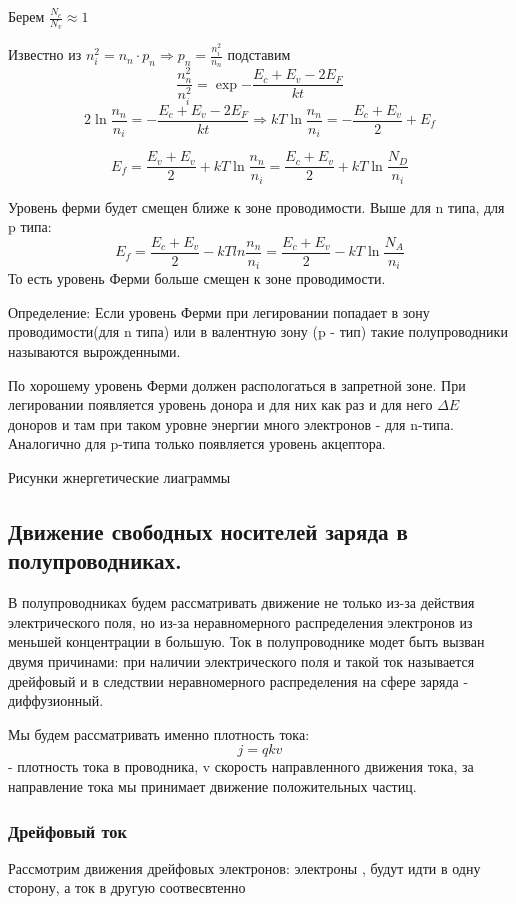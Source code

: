 \documentclass[../main.tex]{subfiles}
\begin{document}
Берем $\frac{N_c}{N_v} \approx 1$ 

Известно из $n_i^2 = n_n \cdot p_n \Rightarrow p_n = \frac{n_i^2}{n_n}$ подставим 
\[\frac{n_n^2}{n_i^2} = \exp{- \frac{E_c + E_v - 2E_F}{kt}}\]
\[2 \ln{\frac{n_n}{n_i}} = - \frac{E_c + E_v - 2E_F}{kt} \Rightarrow kT \ln{\frac{n_n}{n_i} = - \frac{E_c + E_v}{2} +E_f}\]

\[E_f = \frac{E_v + E_v}{2} + kT \ln{\frac{n_n}{n_i}} = \frac{E_c + E_v}{2} + kT \ln{\frac{N_D}{n_i}}\]

Уровень ферми будет смещен ближе к зоне проводимости. Выше для n типа, для p типа: 
\[E_f = \frac{E_c + E_v}{2} - kTln \frac{n_n}{n_i} = \frac{E_c+E_v}{2} - kT \ln{\frac{N_A}{n_i}}\]
То есть уровень Ферми больше смещен к зоне проводимости.

Определение: Если уровень Ферми при легировании попадает в зону проводимости(для n типа) или в валентную зону (p - тип) такие полупроводники называются вырожденными.

По хорошему уровень Ферми должен распологаться в запретной зоне.
При легировании появляется уровень донора и для них как раз и для него $\Delta E$ доноров и там при таком уровне энергии много электронов - для n-типа. Аналогично для p-типа 
только появляется уровень акцептора.

Рисунки жнергетические лиаграммы

\subsection{Движение свободных носителей заряда в полупроводниках.}

В полупроводниках будем рассматривать движение не только из-за действия электрического поля, но из-за неравномерного распределения электронов из меньшей концентрации в большую.
Ток в полупроводнике модет быть вызван двумя причинами: при наличии электрического поля и такой ток называется дрейфовый и в следствии неравномерного распределения на сфере заряда - диффузионный.

Мы будем рассматривать именно плотность тока:
\[j = q k v\]
 - плотность тока в проводника, v скорость направленного движения тока, за направление тока мы принимает движение положительных частиц.

\subsubsection{Дрейфовый ток}

Рассмотрим движения дрейфовых электронов: электроны , будут идти в одну сторону, а ток в другую соотвесвтенно
\end{document}
